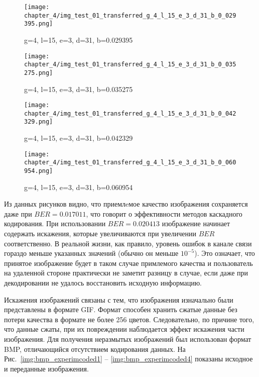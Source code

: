 \begin{figure}[h]
\begin{center}
\begin{minipage}[h]{0.4\linewidth}
\texttt{[image: chapter\_4/img\_test\_01\_transferred\_g\_4\_l\_15\_e\_3\_d\_31\_b\_0\_029395.png]}
\caption{g=4, l=15, e=3, d=31, b=0.029395}
\label{img:experimcoded9}
\end{minipage}
\hfill 
\begin{minipage}[h]{0.4\linewidth}
\texttt{[image: chapter\_4/img\_test\_01\_transferred\_g\_4\_l\_15\_e\_3\_d\_31\_b\_0\_035275.png]}
\caption{g=4, l=15, e=3, d=31, b=0.035275}
\label{img:experimcoded10}
\end{minipage}
\end{center}

\begin{center}
\begin{minipage}[h]{0.4\linewidth}
\texttt{[image: chapter\_4/img\_test\_01\_transferred\_g\_4\_l\_15\_e\_3\_d\_31\_b\_0\_042329.png]}
\caption{g=4, l=15, e=3, d=31, b=0.042329}
\label{img:experimcoded11}
\end{minipage}
\hfill 
\begin{minipage}[h]{0.4\linewidth}
\texttt{[image: chapter\_4/img\_test\_01\_transferred\_g\_4\_l\_15\_e\_3\_d\_31\_b\_0\_060954.png]}
\caption{g=4, l=15, e=3, d=31, b=0.060954}
\label{img:experimcoded12}
\end{minipage}
\end{center}
\end{figure}

Из данных рисунков видно, что приемлeмое качество изображения сохраняется даже при $BER=0.017011$, что говорит
о эффективности методов каскадного кодирования. При использовании $BER=0.020413$ изображение начинает содержать
искажения, которые увеличиваются при увеличении $BER$ соответственно. В реальной жизни, как правило, уровень ошибок в канале связи
гораздо меньше указанных значений (обычно он меньше $10^{-5}$). Это означает, что принятое изображение будет в таком случае примлемого
качества и пользователь на удаленной стороне практически не заметит разницу в случае, если даже при декодировании не удалось
восстановить исходную информацию.

Искажения изображений связаны с тем, что изображения изначально были представлены в формате GIF.
Формат способен хранить сжатые данные без потери качества в формате не более 256 цветов. Следовательно,
по причине того, что данные сжаты, при их повреждении наблюдается эффект искажения части изображения.
Для получения неразмытых изображений был использован формат BMP, отличающийся отсутствием кодирования данных.
На Рис.~\ref{img:bmp_experimcoded1} -- \ref{img:bmp_experimcoded4}  показаны исходное и переданные изображения.

